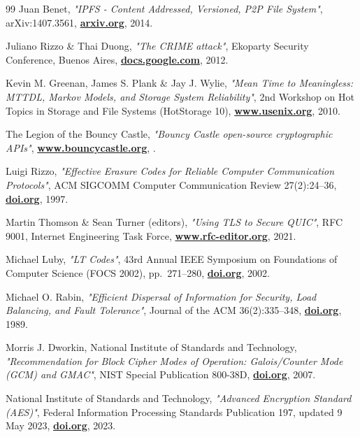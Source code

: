 \documentclass[10pt,a4paper,final]{article}
\let\oldhref\href
\renewcommand{\href}[2]{\oldhref{#1}{\bfseries#2}}
\begin{document}
\begin{thebibliography}{99}
	Juan Benet,
	\emph{"IPFS - Content Addressed, Versioned, P2P File System"},
	arXiv:1407.3561,
	\href{https://arxiv.org/abs/1407.3561}{arxiv.org},
	2014.

	Juliano Rizzo \& Thai Duong,
	\emph{"The CRIME attack"},
	Ekoparty Security Conference, Buenos Aires,
	\href{https://docs.google.com/presentation/d/11eBmGiHbYcHR9gL5nDyZChu_-lCa2GizeuOfaLU2HOU/}{docs.google.com},
	2012.

	Kevin M. Greenan, James S. Plank \& Jay J. Wylie,
	\emph{"Mean Time to Meaningless: MTTDL, Markov Models, and Storage System Reliability"},
	2nd Workshop on Hot Topics in Storage and File Systems (HotStorage 10),
	\href{https://www.usenix.org/conference/hotstorage-10/mean-time-meaningless-mttdl-markov-models-and-storage-system-reliability}{www.usenix.org},
	2010.

	The Legion of the Bouncy Castle,
	\emph{"Bouncy Castle open-source cryptographic APIs"},
	\href{https://www.bouncycastle.org/}{www.bouncycastle.org},
	\the\year{}.

	Luigi Rizzo,
	\emph{"Effective Erasure Codes for Reliable Computer Communication Protocols"},
	ACM SIGCOMM Computer Communication Review 27(2):24--36,
	\href{https://doi.org/10.1145/263876.263881}{doi.org},
	1997.

	Martin Thomson \& Sean Turner (editors),
	\emph{"Using TLS to Secure QUIC"},
	RFC 9001, Internet Engineering Task Force,
	\href{https://www.rfc-editor.org/rfc/rfc9001}{www.rfc-editor.org},
	2021.

	Michael Luby,
	\emph{"LT Codes"},
	43rd Annual IEEE Symposium on Foundations of Computer Science (FOCS 2002), pp.~271--280,
	\href{https://doi.org/10.1109/SFCS.2002.1181950}{doi.org},
	2002.

	Michael O. Rabin,
	\emph{"Efficient Dispersal of Information for Security, Load Balancing, and Fault Tolerance"},
	Journal of the ACM 36(2):335--348,
	\href{https://doi.org/10.1145/62044.62050}{doi.org},
	1989.

	Morris J. Dworkin, National Institute of Standards and Technology,
	\emph{"Recommendation for Block Cipher Modes of Operation: Galois/Counter Mode (GCM) and GMAC"},
	NIST Special Publication 800-38D,
	\href{https://doi.org/10.6028/NIST.SP.800-38D}{doi.org},
	2007.

	National Institute of Standards and Technology,
	\emph{"Advanced Encryption Standard (AES)"},
	Federal Information Processing Standards Publication 197, updated 9 May 2023,
	\href{https://doi.org/10.6028/NIST.FIPS.197-upd1}{doi.org},
	2023.


\end{thebibliography}
\end{document}
